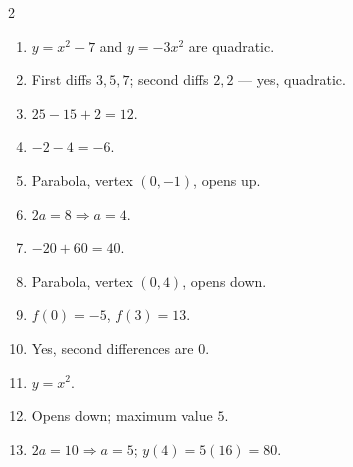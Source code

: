 \documentclass[11pt]{article}
\begin{document}
\begin{keybox}
\begin{multicols}{2}
\small
\begin{enumerate}[leftmargin=*,itemsep=3pt]
  \item $y=x^2-7$ and $y=-3x^2$ are quadratic.
  \item First diffs $3,5,7$; second diffs $2,2$ --- yes, quadratic.
  \item $25-15+2=12$.
  \item $-2-4=-6$.
  \item Parabola, vertex $(0,-1)$, opens up.
  \item $2a=8\Rightarrow a=4$.
  \item $-20+60=40$.
  \item Parabola, vertex $(0,4)$, opens down.
  \item $f(0)=-5$, $f(3)=13$.
  \item Yes, second differences are $0$.
  \item $y=x^2$.
  \item Opens down; maximum value $5$.
  \item $2a=10\Rightarrow a=5$; $y(4)=5(16)=80$.
\end{enumerate}
\end{multicols}
\end{keybox}
\end{document}
